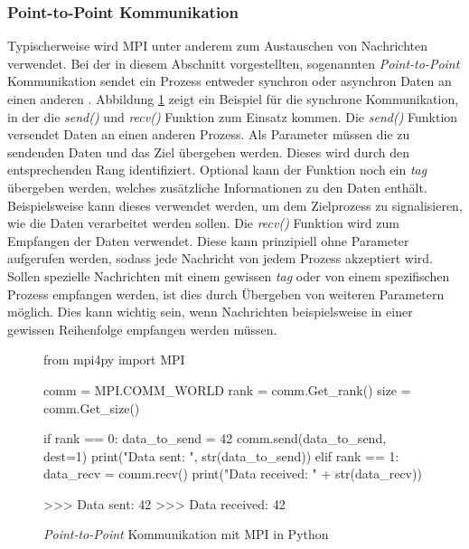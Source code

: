 \subsubsection{Point-to-Point Kommunikation}
\label{subsubsec:point_to_point_communication}
Typischerweise wird \ac{MPI} unter anderem zum Austauschen von Nachrichten verwendet. Bei der in diesem Abschnitt vorgestellten, sogenannten \emph{Point-to-Point} Kommunikation sendet ein Prozess entweder synchron oder asynchron Daten an einen anderen \cite{nielsen2016introduction}. Abbildung \ref{fig:example_point_to_point} zeigt ein Beispiel für die synchrone Kommunikation, in der die \emph{send()} und \emph{recv()} Funktion zum Einsatz kommen. Die \emph{send()} Funktion versendet Daten an einen anderen Prozess. Als Parameter müssen die zu sendenden Daten und das Ziel übergeben werden. Dieses wird durch den entsprechenden Rang identifiziert. Optional kann der Funktion noch ein \emph{tag} übergeben werden, welches zusätzliche Informationen zu den Daten enthält. Beispielsweise kann dieses verwendet werden, um dem Zielprozess zu signalisieren, wie die Daten verarbeitet werden sollen. Die \emph{recv()} Funktion wird zum Empfangen der Daten verwendet. Diese kann prinzipiell ohne Parameter aufgerufen werden, sodass jede Nachricht von jedem Prozess akzeptiert wird. Sollen spezielle Nachrichten mit einem gewissen \emph{tag} oder von einem spezifischen Prozess empfangen werden, ist dies durch Übergeben von weiteren Parametern möglich. Dies kann wichtig sein, wenn Nachrichten beispielsweise in einer gewissen Reihenfolge empfangen werden müssen. 
\begin{figure}
	\begin{python}
		from mpi4py import MPI
		
		comm = MPI.COMM_WORLD
		rank = comm.Get_rank()
		size = comm.Get_size()
		
		if rank == 0:
			data_to_send = 42
			comm.send(data_to_send, dest=1)
			print("Data sent: ", str(data_to_send))
		elif rank == 1:
			data_recv = comm.recv()
			print("Data received: " + str(data_recv))
			
		>>> Data sent:  42
		>>> Data received: 42
	\end{python}
	\caption{\emph{Point-to-Point} Kommunikation mit \ac{MPI} in Python}
	\label{fig:example_point_to_point}
\end{figure}
\\ \noindent
